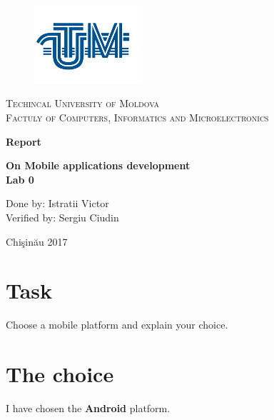 \documentclass[12pt]{article}
\begin{document}
    \begin{titlepage}
        \centering
        \begin{figure}[t]
        \centering
        \includegraphics[width=4cm]{utm2.png}
        \end{figure}
        { \scshape\Large Techincal University of Moldova \\ Factuly of Computers, Informatics and Microelectronics \par }
        
        \vspace{5cm}
        { \Huge\bfseries Report \par }
        { \Large\bfseries On Mobile applications development \\ }
        { \Large\bfseries Lab 0 }

        \vspace{5cm}
        \begin{flushright}
            Done by: Istratii Victor \\
            Verified by: Sergiu Ciudin
        \end{flushright}

        \vfill

        Chişinău 2017
        
    \end{titlepage}


    \newpage


    \section*{Task}
        Choose a mobile platform and explain your choice.

    \section*{The choice}
        I have chosen the \textbf{Android} platform.
\end{document}
